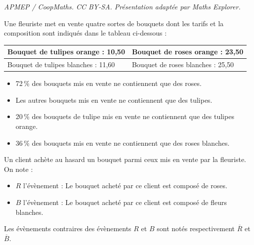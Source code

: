 \documentclass[10pt]{article}
\providecommand{\euro}{\texteuro}
\providecommand{\euro}{{\text{€}}}
\renewcommand{\euro}{\ifmmode\text{\texteuro}\else\texteuro\fi}
\begin{document}
\noindent\textit{APMEP / CoopMaths. CC BY-SA. Présentation adaptée par Maths Explorer.}\par\medskip
\medskip

Une fleuriste met en vente quatre sortes de bouquets dont les tarifs et la composition sont
indiqués dans le tableau ci-dessous :

\medskip
\begin{center}
\begin{tabularx}{0.85\linewidth}{|*{2}{X|}}\hline
Bouquet de tulipes orange : 10,50 \euro  & Bouquet de roses orange : 23,50 \euro\\\hline
Bouquet de tulipes blanches : 11,60 \euro& Bouquet de roses blanches : 25,50 \euro\\\hline
\end{tabularx}
\end{center}
\medskip

\begin{itemize}
\item 72\,\% des bouquets mis en vente ne contiennent que des roses.
\item Les autres bouquets mis en vente ne contiennent que des tulipes.
\item 20\,\% des bouquets de tulipe mis en vente ne contiennent que des tulipes orange.
\item 36\,\% des bouquets mis en vente ne contiennent que des roses blanches.
\end{itemize}
Un client achète au hasard un bouquet parmi ceux mis en vente par la fleuriste. On note :

\begin{itemize}
\item $R$ l'évènement : \og Le bouquet acheté par ce client est composé de roses.\fg
\item $B$ l'évènement : \og Le bouquet acheté par ce client est composé de fleurs blanches. \fg
\end{itemize}
Les évènements contraires des évènements $R$ et $B$ sont notés respectivement $\overline{R}$ et $\overline{B}$.

\medskip
\end{document}
